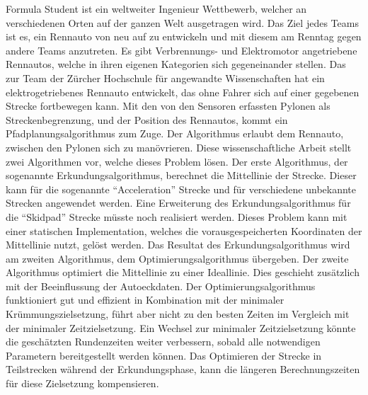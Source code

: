 Formula Student ist ein weltweiter Ingenieur Wettbewerb, welcher an verschiedenen Orten auf der ganzen Welt ausgetragen wird. Das Ziel jedes Teams ist es, ein Rennauto von neu auf zu entwickeln und mit diesem am Renntag gegen andere Teams anzutreten. Es gibt Verbrennungs- und Elektromotor angetriebene Rennautos, welche in ihren eigenen Kategorien sich gegeneinander stellen. Das \acrlong{zur} Team der Zürcher Hochschule für angewandte Wissenschaften hat ein elektrogetriebenes Rennauto entwickelt, das ohne Fahrer sich auf einer gegebenen Strecke fortbewegen kann. Mit den von den Sensoren erfassten Pylonen als Streckenbegrenzung, und der Position des Rennautos, kommt ein Pfadplanungsalgorithmus zum Zuge. Der Algorithmus erlaubt dem Rennauto, zwischen den Pylonen sich zu manövrieren. Diese wissenschaftliche Arbeit stellt zwei Algorithmen vor, welche dieses Problem lösen. Der erste Algorithmus, der sogenannte Erkundungsalgorithmus, berechnet die Mittellinie der Strecke. Dieser kann für die sogenannte ``Acceleration'' Strecke und für verschiedene unbekannte Strecken angewendet werden. Eine Erweiterung des Erkundungsalgorithmus für die ``Skidpad'' Strecke müsste noch realisiert werden. Dieses Problem kann mit einer statischen Implementation, welches die vorausgespeicherten Koordinaten der Mittellinie nutzt, gelöst werden. Das Resultat des Erkundungsalgorithmus wird am zweiten Algorithmus, dem Optimierungsalgorithmus übergeben. Der zweite Algorithmus optimiert die Mittellinie zu einer Ideallinie. Dies geschieht zusätzlich mit der Beeinflussung der Autoeckdaten. Der Optimierungsalgorithmus funktioniert gut und effizient in Kombination mit der minimaler Krümmungszielsetzung, führt aber nicht zu den besten Zeiten im Vergleich mit der minimaler Zeitzielsetzung. Ein Wechsel zur minimaler Zeitzielsetzung könnte die geschätzten Rundenzeiten weiter verbessern, sobald alle notwendigen Parametern bereitgestellt werden können. Das Optimieren der Strecke in Teilstrecken während der Erkundungsphase, kann die längeren Berechnungszeiten für diese Zielsetzung kompensieren.
